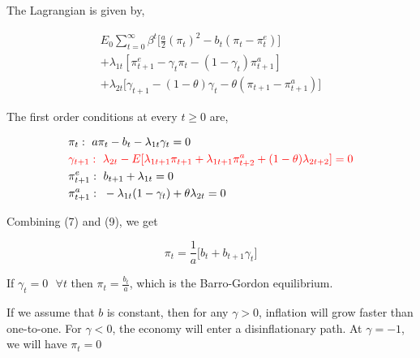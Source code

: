 \documentclass[12pt]{article}
\theoremstyle{definition}
\theoremstyle{plain}
\theoremstyle{plain}
\theoremstyle{remark}
\theoremstyle{plain}
\begin{document}
\justify
The Lagrangian is given by, 

\begin{equation}
\begin{split}
E_{0} \sum^{\infty}_{t=0} \beta^{t}\Big[\frac{a}{2} (\pi_{t})^{2} - b_{t}(\pi_{t}-\pi^{e}_{t})] \\
+ \lambda_{1t}[\pi^{e}_{t+1} - \gamma_{t}\pi_{t} - (1-\gamma_{t})\pi^{a}_{t+1}] \\
+ \lambda_{2t}[\gamma_{t+1} - (1-\theta)\gamma_{t} - \theta(\pi_{t+1} - \pi^{a}_{t+1}) \Big]
\end{split}
\end{equation}

\justify 
The first order conditions at every $t \geq 0$ are, 

\begin{align}
&{\pi_{t}}: \mbox{  }a\pi_{t}- b_{t} - \lambda_{1t}\gamma_{t} = 0 \\
&\textcolor{red}{{\gamma_{t+1}}: \mbox{  }\lambda_{2t} - E[\lambda_{1t+1}\pi_{t+1} + \lambda_{1t+1}\pi^{a}_{t+2} + (1-\theta) \lambda_{2t+2}] = 0} \\
&{\pi^{e}_{t+1}}: \mbox{  } b_{t+1} + \lambda_{1t} =0 \\
&{\pi^{a}_{t+1}}: \mbox{  }-\lambda_{1t}(1-\gamma_{t}) + \theta\lambda_{2t} = 0
\end{align}

\justify 
Combining (7) and (9), we get 

\begin{equation}
\pi_{t} = \frac{1}{a}\big[b_{t} + b_{t+1}\gamma_{t} \big]
\end{equation}

\justify 
If $\gamma_{t}=0 \mbox{  } \forall t$ then $\pi_{t}=\frac{b_{t}}{a}$, which is the Barro-Gordon equilibrium. 

\justify 
If we assume that $b$ is constant, then for any $\gamma > 0$, inflation will grow faster than one-to-one. For $\gamma < 0$, the economy will enter a disinflationary path. At $\gamma=-1$, we will have $\pi_{t}=0$

\newpage


\end{document}
